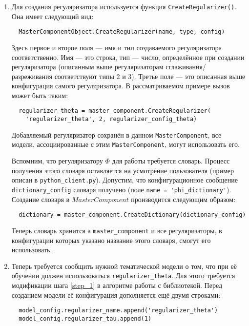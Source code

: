 \begin{enumerate}
	\item Для создания регуляризатора используется функция \verb|CreateRegularizer()|. Она имеет следующий вид:
	
	\vspace{4pt}	
	\verb|  MasterComponentObject.CreateRegularizer(name, type, config)|
	\vspace{4pt}	
	
	Здесь первое и второе поля --- имя и тип создаваемого регуляризатора соответственно. Имя --- это строка, тип --- число, определённое при создании регуляризатора (описанным выше регуляризаторам сглаживания/разреживания соответствуют типы 2 и 3). Третье поле --- это описанная выше конфигурация самого регулzризатора. В рассматриваемом примере вызов может быть таким:
	
	\vspace{4pt}	
	\verb|  regularizer_theta = master_component.CreateRegularizer(| \\
	\verb|    'regularizer_theta', 2, regularizer_config_theta)|
	\vspace{4pt}	
	
	Добавляемый регуляризатор сохранён в данном \verb|MasterComponent|, все модели, ассоциированные с этим \verb|MasterComponent|, могут использовать его.	
	
	Вспомним, что регуляризатору $\Phi$ для работы требуется словарь. Процесс получения этого словаря оставляется на усмотрение пользователя (пример описан в \verb|python_client.py|). Допустим, что конфигурационное сообщение \verb|dictionary_config| словаря получено (поле \verb|name = 'phi_dictionary'|). Создание словаря в $MasterComponent$ производится следующим образом:

	\vspace{4pt}
	\verb|  dictionary = master_component.CreateDictionary(dictionary_config)|
	\vspace{4pt}
	
	Теперь словарь хранится а \verb|master_component| и все регуляризаторы, в конфигурации которых указано название этого словаря, смогут его использовать.	
	
	\item Теперь требуется сообщить нужной тематической модели о том, что при её обучении должен использоваться \verb|regularizer_theta|. Для этого требуется модификации шага \ref{step_1} в алгоритме работы с библиотекой. Перед созданием модели её конфигурация дополняется ещё двумя строками:
	
	\vspace{4pt}	
	\verb|  model_config.regularizer_name.append('regularizer_theta')| \\
	\verb|  model_config.regularizer_tau.append(1)|
	\vspace{4pt}	
		

\end{enumerate}
